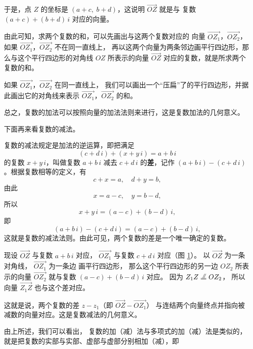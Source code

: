 于是，点 $Z$ 的坐标是 $(a + c,\; b + d)$，这说明 $\overrightarrow{OZ}$ 就是与
复数 $(a + c) + (b + d)\,i$ 对应的向量。

由此可知，求两个复数的和，可以先画出与这两个复数对应的
向量 $\overrightarrow{OZ_1}$，$\overrightarrow{OZ_2}$，
如果 $\overrightarrow{OZ_1}$，$\overrightarrow{OZ_2}$ 不在同一直线上，
再以这两个向量为两条邻边画平行四边形，那么与这个平行四边形的对角线 $OZ$
所表示的向量 $\overrightarrow{OZ}$ 对应的复数，就是所求两个复数的和。

如果 $\overrightarrow{OZ_1}$，$\overrightarrow{OZ_2}$ 在同一直线上，
我们可以画出一个“压扁”了的平行四边形，并据此画出它的对角线来表示
$\overrightarrow{OZ_1}$，$\overrightarrow{OZ_2}$ 的和。

总之，复数的加法可以按照向量的加法法则来进行，这是复数加法的几何意义。

下面再来看复数的减法。

复数的减法规定是加法的逆运算，即把满足
$$ (c + d\,i) + (x + y\,i) = a + b\,i $$
的复数 $x + y\,i$，叫做复数 $a + b\,i$ 减去 $c + d\,i$
的\textbf{差}，记作 $(a + b\,i) - (c + d\,i)$。根据复数相等的定义，有
$$ c + x = a,\quad d + y = b, $$
由此
$$ x = a - c,\quad y = b - d, $$
所以
$$ x + y\,i = (a - c) + (b - d)\,i, $$
即
$$ (a + b\,i) - (c + d\,i) = (a - c) + (b - d)\,i, $$
这就是复数的减法法则。由此可见，两个复数的差是一个唯一确定的复数。

现设 $\overrightarrow{OZ}$ 与复数 $a + b\,i$ 对应，
$\overrightarrow{OZ_1}$ 与复数 $c + d\,i$ 对应（图 \ref{fig:5-6}）。
以 $\overrightarrow{OZ}$ 为一条对角线， $\overrightarrow{OZ_1}$ 为一条边
画平行四边形， 那么这个平行四边形的另一边 $OZ_2$ 所表示的向量 $\overrightarrow{OZ_2}$
就与复数 $(a - c) + (b - d)\,i$ 对应。 因为 $Z_1Z \pxdy OZ_2$，
所以向量 $\overrightarrow{Z_1Z}$ 也与这个差对应。

\begin{figure}[htbp]
    \centering
    
    \caption{}\label{fig:5-6}
\end{figure}


这就是说，两个复数的差 $z - z_1$（即 $\overrightarrow{OZ} - \overrightarrow{OZ_1}$）
与连结两个向量终点并指向被减数的向量对应。这是复数减法的几何意义。

由上所述，我们可以看出， 复数的加（减）法与多项式的加（减）法是类似的，
就是把复数的实部与实部、虚部与虚部分别相加（减），即

\begin{center}
\end{center}


